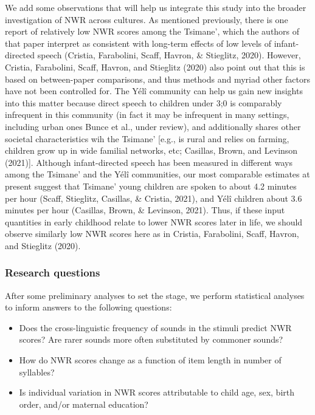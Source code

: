 \documentclass[
  american,
  ,man,floatsintext]{apa6}
\providecommand{\tightlist}{%
  \setlength{\itemsep}{0pt}\setlength{\parskip}{0pt}}
\begin{document}
We add some observations that will help us integrate this study into the broader investigation of NWR across cultures. As mentioned previously, there is one report of relatively low NWR scores among the Tsimane', which the authors of that paper interpret as consistent with long-term effects of low levels of infant-directed speech (Cristia, Farabolini, Scaff, Havron, \& Stieglitz, 2020). However, Cristia, Farabolini, Scaff, Havron, and Stieglitz (2020) also point out that this is based on between-paper comparisons, and thus methods and myriad other factors have not been controlled for. The Yélî community can help us gain new insights into this matter because direct speech to children under 3;0 is comparably infrequent in this community (in fact it may be infrequent in many settings, including urban ones Bunce et al., under review), and additionally shares other societal characteristics wih the Tsimane' {[}e.g., is rural and relies on farming, children grow up in wide familial networks, etc; Casillas, Brown, and Levinson (2021){]}. Although infant-directed speech has been measured in different ways among the Tsimane' and the Yélî communities, our most comparable estimates at present suggest that Tsimane' young children are spoken to about 4.2 minutes per hour (Scaff, Stieglitz, Casillas, \& Cristia, 2021), and Yélî children about 3.6 minutes per hour (Casillas, Brown, \& Levinson, 2021). Thus, if these input quantities in early childhood relate to lower NWR scores later in life, we should observe similarly low NWR scores here as in Cristia, Farabolini, Scaff, Havron, and Stieglitz (2020).

\hypertarget{research-questions}{%
\subsubsection{Research questions}\label{research-questions}}

After some preliminary analyses to set the stage, we perform statistical analyses to inform answers to the following questions:

\begin{itemize}
\tightlist
\item
  Does the cross-linguistic frequency of sounds in the stimuli predict NWR scores? Are rarer sounds more often substituted by commoner sounds?
\item
  How do NWR scores change as a function of item length in number of syllables?
\item
  Is individual variation in NWR scores attributable to child age, sex, birth order, and/or maternal education?
\end{itemize}
\end{document}
